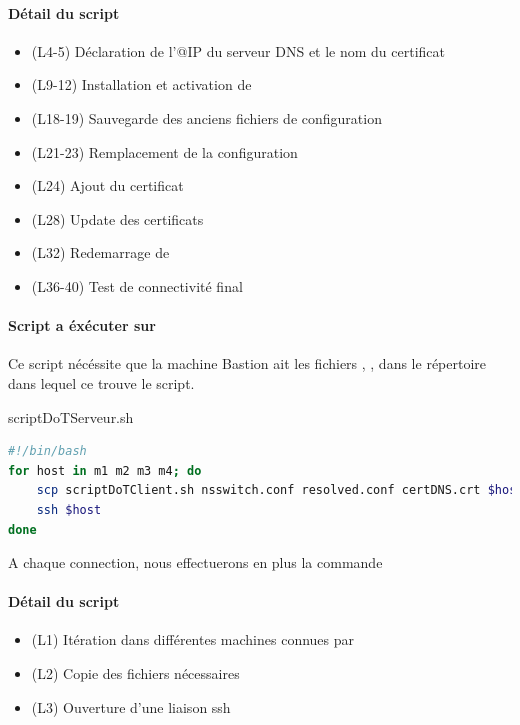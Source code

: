 \documentclass{article}
\begin{document}
\paragraph{Détail du script}
\begin{itemize}
	\item (L4-5) Déclaration de l'@IP du serveur DNS et le nom du certificat
	\item (L9-12) Installation et activation de 
	\item (L18-19) Sauvegarde des anciens fichiers de configuration
	\item (L21-23) Remplacement de la configuration
	\item (L24) Ajout du certificat
	\item (L28) Update des certificats
	\item (L32) Redemarrage de 
	\item (L36-40) Test de connectivité final
\end{itemize}

\newpage

\paragraph{Script a éxécuter sur \\}
Ce script nécéssite que la machine Bastion ait les fichiers , ,  dans le répertoire dans lequel ce trouve le script.

\begin{codebox}{scriptDoTServeur.sh}
\begin{lstlisting}[language=Bash]
#!/bin/bash
for host in m1 m2 m3 m4; do
    scp scriptDoTClient.sh nsswitch.conf resolved.conf certDNS.crt $host:/tmp/
    ssh $host
done
\end{lstlisting}
\end{codebox}
A chaque connection, nous effectuerons en plus la commande 
\paragraph{Détail du script}
\begin{itemize}
	 \item (L1) Itération dans différentes machines connues par 
	 \item (L2) Copie des fichiers nécessaires
	 \item (L3) Ouverture d'une liaison ssh
\end{itemize}
\end{document}
